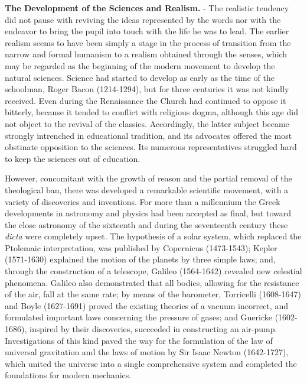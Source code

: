 \documentclass[
]{book}
\begin{document}
\textbf{The Development of the Sciences and Realism.} - The realistic tendency did not pause with reviving the ideas represented by the words nor with the endeavor to bring the pupil into touch with the life he was to lead. The earlier realism seems to have been simply a stage in the process of transition from the narrow and formal humanism to a realism obtained through the senses, which may be regarded as the beginning of the modern movement to develop the natural sciences. Science had started to develop as early as the time of the schoolman, Roger Bacon (1214-1294), but for three centuries it was not kindly received. Even during the Renaissance the Church had continued to oppose it bitterly, because it tended to conflict with religious dogma, although this age did not object to the revival of the classics. Accordingly, the latter subject became strongly intrenched in educational tradition, and its advocates offered the most obstinate opposition to the sciences. Its numerous representatives struggled hard to keep the sciences out of education.

However, concomitant with the growth of reason and the partial removal of the theological ban, there was developed a remarkable scientific movement, with a variety of discoveries and inventions. For more than a millennium the Greek developments in astronomy and physics had been accepted as final, but toward the close astronomy of the sixteenth and during the seventeenth century these \emph{dicta} were completely upset. The hypothesis of a solar system, which replaced the Ptolemaic interpretation, was published by Copernicus (1473-1543); Kepler (1571-1630) explained the motion of the planets by three simple laws; and, through the construction of a telescope, Galileo (1564-1642) revealed new celestial phenomena. Galileo also demonstrated that all bodies, allowing for the resistance of the air, fall at the same rate; by means of the barometer, Torricelli (1608-1647) and Boyle (1627-1691) proved the existing theories of a vacuum incorrect, and formulated important laws concerning the pressure of gases; and Guericke (1602-1686), inspired by their discoveries, succeeded in constructing an air-pump. Investigations of this kind paved the way for the formulation of the law of universal gravitation and the laws of motion by Sir Isaac Newton (1642-1727), which united the universe into a single comprehensive system and completed the foundations for modern mechanics.
\end{document}
